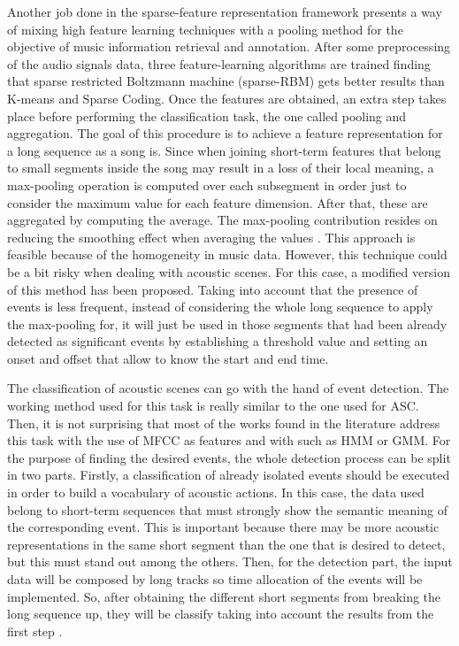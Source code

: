 Another job done in the sparse-feature representation framework presents a way of mixing high feature learning techniques with a pooling method for the objective of music information retrieval and annotation. After some preprocessing of the audio signals data, three feature-learning algorithms are trained finding that sparse restricted Boltzmann machine (sparse-RBM) gets better results than K-means and Sparse Coding. Once the features are obtained, an extra step takes place before performing the classification task, the one called pooling and aggregation. The goal of this procedure is to achieve a feature representation for a long sequence as a song is. Since when joining short-term features that belong to small segments inside the song may result in a loss of their local meaning, a max-pooling operation is computed over each subsegment in order just to consider the maximum value for each feature dimension. After that, these are aggregated by computing the average. The max-pooling contribution resides on reducing the smoothing effect when averaging the values \cite{Nam2012}. This approach is feasible because of the homogeneity in music data. However, this technique could be a bit risky when dealing with acoustic scenes. For this case, a modified version of this method has been proposed. Taking into account that the presence of events is less frequent, instead of considering the whole long sequence to apply the max-pooling for, it will just be used in those segments that had been already detected as significant events by establishing a threshold value and setting an onset and offset that allow to know the start and end time\cite{Lee2013}.

The classification of acoustic scenes can go with the hand of event detection. The working method used for this task is really similar to the one used for ASC. Then, it is not surprising that most of the works found in the literature address this task with the use of MFCC as features and with such as HMM or GMM. For the purpose of finding the desired events, the whole detection process can be split in two parts. Firstly, a classification of already isolated events should be executed in order to build a vocabulary of acoustic actions. In this case, the data used belong to short-term sequences that must strongly show the semantic meaning of the corresponding event. This is important because there may be more acoustic representations in the same short segment than the one that is desired to detect, but this must stand out among the others.  Then, for the detection part, the input data will be composed by long tracks so time allocation of the events will be implemented. So, after obtaining the different short segments from breaking the long sequence up, they will be classify taking into account the results from the first step \cite{Mesaros2010}. 

